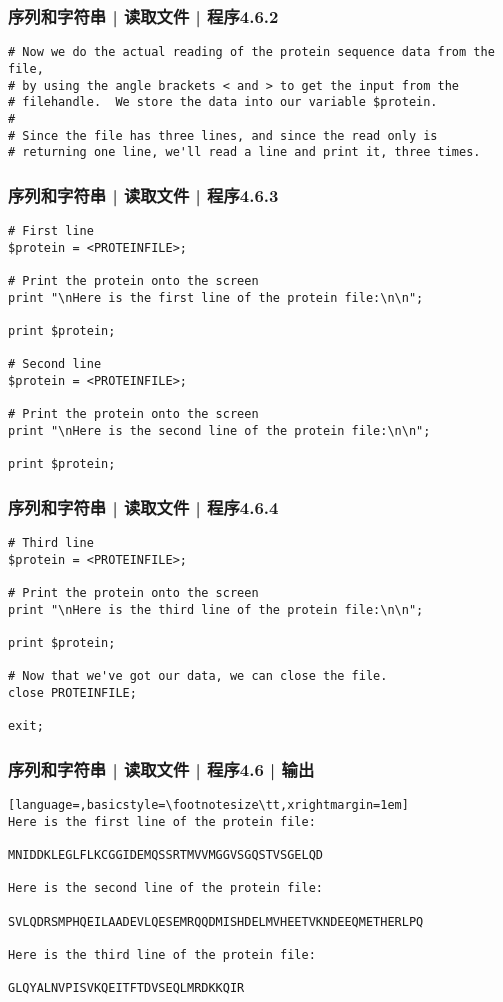 \begin{frame}[fragile]
  \frametitle{序列和字符串 | 读取文件 | 程序4.6.2}
  \vspace{-1.5em}
\begin{lstlisting}[firstnumber=12]
# Now we do the actual reading of the protein sequence data from the file,
# by using the angle brackets < and > to get the input from the
# filehandle.  We store the data into our variable $protein.
#
# Since the file has three lines, and since the read only is
# returning one line, we'll read a line and print it, three times.
\end{lstlisting}
\end{frame}

\begin{frame}[fragile]
  \frametitle{序列和字符串 | 读取文件 | 程序4.6.3}
  \vspace{-1.5em}
\begin{lstlisting}[firstnumber=19,basicstyle=\small\tt]
# First line
$protein = <PROTEINFILE>;

# Print the protein onto the screen
print "\nHere is the first line of the protein file:\n\n";

print $protein;

# Second line
$protein = <PROTEINFILE>;

# Print the protein onto the screen
print "\nHere is the second line of the protein file:\n\n";

print $protein;
\end{lstlisting}
\end{frame}

\begin{frame}[fragile]
  \frametitle{序列和字符串 | 读取文件 | 程序4.6.4}
  \vspace{-1.5em}
\begin{lstlisting}[firstnumber=35]
# Third line
$protein = <PROTEINFILE>;

# Print the protein onto the screen
print "\nHere is the third line of the protein file:\n\n";

print $protein;

# Now that we've got our data, we can close the file.
close PROTEINFILE;

exit;
\end{lstlisting}
\end{frame}

\begin{frame}[fragile]
  \frametitle{序列和字符串 | 读取文件 | 程序4.6 | 输出}
  \vspace{-1.5em}
\begin{lstlisting}[language=,basicstyle=\footnotesize\tt,xrightmargin=1em]
Here is the first line of the protein file:

MNIDDKLEGLFLKCGGIDEMQSSRTMVVMGGVSGQSTVSGELQD

Here is the second line of the protein file:

SVLQDRSMPHQEILAADEVLQESEMRQQDMISHDELMVHEETVKNDEEQMETHERLPQ

Here is the third line of the protein file:

GLQYALNVPISVKQEITFTDVSEQLMRDKKQIR
\end{lstlisting}
\end{frame}


